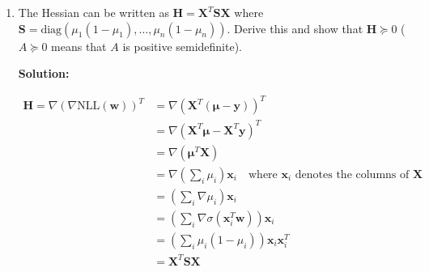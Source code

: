 \documentclass[letter,11pt]{article}
\newenvironment{solution}{
    \vspace{0.16in} {\bf Solution:}
    
}{
	\vspace{0.16in}
}
\begin{document}
\begin{enumerate}
\begin{enumerate}
\begin{solution}
            \begin{align*}
                \text{NLL}({\textbf{w}}) &= -\sum_{i=1}^N [y_i \log \sigma(\textbf{w}^T \textbf{x}_i) + (1 - y_i) \log (1 - \sigma(\textbf{w}^T \textbf{x}_i))] \\
                \nabla \text{NLL}(\textbf{w}) &= -\sum_{i=1}^N \left[y_i \frac{\sigma'(\textbf{w}^T \textbf{x}_i) \textbf{x}_i}{\sigma(\textbf{w}^T \textbf{x}_i)} + (1 - y_i) \left( \frac{-\sigma'(\textbf{w}^T \textbf{x}_i) \textbf{x}_i}{1 - \sigma(\textbf{w}^T \textbf{x}_i)} \right) \right] \\
                    &= -\sum_{i=1}^N \left[ y_i \frac{\sigma(\textbf{w}^T \textbf{x}_i)[1 - \sigma(\textbf{w}^T \textbf{x}_i)]}{\sigma(\textbf{w}^T \textbf{x}_i)} \textbf{x}_i + (1 - y_i) \left( \frac{-\sigma(\textbf{w}^T \textbf{x}_i) [1 - \sigma(\textbf{w}^T \textbf{x}_i)]}{1 - \sigma(\textbf{w}^T \textbf{x}_i)} \right) \textbf{x}_i \right] \\
                    &= -\sum_{i=1}^N \left[ y_i (1 - \sigma(\textbf{w}^T \textbf{x}_i)) \textbf{x}_i + (1 - y_i) (-\sigma(\textbf{w}^T \textbf{x}_i)) \textbf{x}_i \right] \\
                    &= -\sum_{i=1}^N y_i \textbf{x}_i - \sigma(\textbf{w}^T \textbf{x}_i) \textbf{x}_i \\
                    &= \sum_{i=1}^N (\mu_i - y_i) \textbf{x}_i \\
                    &= \textbf{X}^T (\bm{\mu} - \textbf{y})
            \end{align*}
        \end{solution}

        \item The Hessian can be written as $\textbf{H} = \textbf{X}^T \textbf{SX}$ where $\textbf{S} = \text{diag}(\mu_1 (1 - \mu_1), \dots, \mu_n (1 - \mu_n))$. Derive this and show that $\textbf{H} \succeq 0$ ($A \succeq 0$ means that $A$ is positive semidefinite).

        \begin{solution}
            \begin{align*}
                \mathbf{H} = \nabla (\nabla \text{NLL}(\mathbf{w}))^T &= \nabla (\mathbf{X}^T (\bm{\mu} - \mathbf{y}))^T \\
                    &= \nabla (\mathbf{X}^T \bm{\mu} - \mathbf{X}^T \mathbf{y})^T \\
                    &= \nabla (\bm{\mu}^T \mathbf{X}) \\
                    &= \nabla \left(\sum_{i} \mu_i\right) \mathbf{x}_i \quad \text{where } \mathbf{x}_i \text{ denotes the columns of } \mathbf{X} \\
                    &= \left(\sum_i \nabla \mu_i\right) \mathbf{x}_i \\
                    &= \left(\sum_i \nabla \sigma(\mathbf{x}_i^T \mathbf{w})\right) \mathbf{x}_i \\
                    &= \left(\sum_i \mu_i (1 - \mu_i) \right) \mathbf{x}_i \mathbf{x}_i^T \\
                    &= \mathbf{X}^T \mathbf{S} \mathbf{X}
            \end{align*}


\end{solution}
\end{enumerate}
\end{enumerate}
\end{document}
